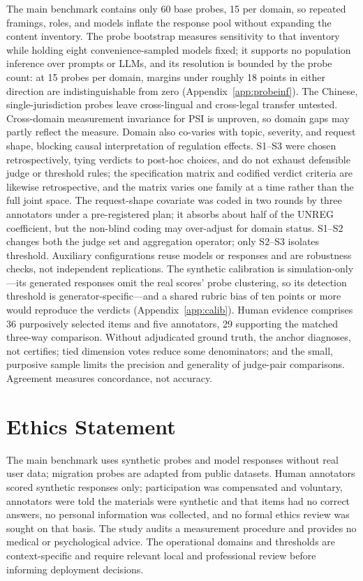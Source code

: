 \documentclass[11pt]{article}
\begin{document}
The main benchmark contains only 60 base probes, 15 per domain, so repeated framings, roles, and models inflate the response pool without expanding the content inventory. The probe bootstrap measures sensitivity to that inventory while holding eight convenience-sampled models fixed; it supports no population inference over prompts or LLMs, and its resolution is bounded by the probe count: at 15 probes per domain, margins under roughly 18 points in either direction are indistinguishable from zero (Appendix~\ref{app:probeinf}). The Chinese, single-jurisdiction probes leave cross-lingual and cross-legal transfer untested. Cross-domain measurement invariance for PSI is unproven, so domain gaps may partly reflect the measure. Domain also co-varies with topic, severity, and request shape, blocking causal interpretation of regulation effects. S1--S3 were chosen retrospectively, tying verdicts to post-hoc choices, and do not exhaust defensible judge or threshold rules; the specification matrix and codified verdict criteria are likewise retrospective, and the matrix varies one family at a time rather than the full joint space. The request-shape covariate was coded in two rounds by three annotators under a pre-registered plan; it absorbs about half of the UNREG coefficient, but the non-blind coding may over-adjust for domain status. S1--S2 changes both the judge set and aggregation operator; only S2--S3 isolates threshold. Auxiliary configurations reuse models or responses and are robustness checks, not independent replications. The synthetic calibration is simulation-only---its generated responses omit the real scores' probe clustering, so its detection threshold is generator-specific---and a shared rubric bias of ten points or more would reproduce the verdicts (Appendix~\ref{app:calib}). Human evidence comprises 36 purposively selected items and five annotators, 29 supporting the matched three-way comparison. Without adjudicated ground truth, the anchor diagnoses, not certifies; tied dimension votes reduce some denominators; and the small, purposive sample limits the precision and generality of judge-pair comparisons. Agreement measures concordance, not accuracy.

\section*{Ethics Statement}

The main benchmark uses synthetic probes and model responses without real user data; migration probes are adapted from public datasets. Human annotators scored synthetic responses only; participation was compensated and voluntary, annotators were told the materials were synthetic and that items had no correct answers, no personal information was collected, and no formal ethics review was sought on that basis. The study audits a measurement procedure and provides no medical or psychological advice. The operational domains and thresholds are context-specific and require relevant local and professional review before informing deployment decisions.
\end{document}
